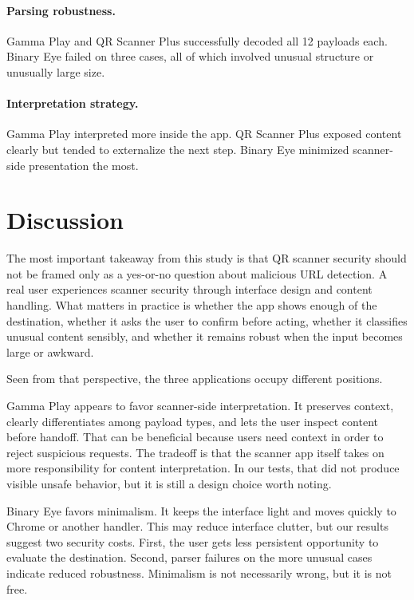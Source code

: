 \documentclass[11pt]{article}
\begin{document}
\paragraph{Parsing robustness.}
Gamma Play and QR Scanner Plus successfully decoded all 12 payloads each. Binary Eye failed on three cases, all of which involved unusual structure or unusually large size.

\paragraph{Interpretation strategy.}
Gamma Play interpreted more inside the app. QR Scanner Plus exposed content clearly but tended to externalize the next step. Binary Eye minimized scanner-side presentation the most.

\section{Discussion}

The most important takeaway from this study is that QR scanner security should not be framed only as a yes-or-no question about malicious URL detection. A real user experiences scanner security through interface design and content handling. What matters in practice is whether the app shows enough of the destination, whether it asks the user to confirm before acting, whether it classifies unusual content sensibly, and whether it remains robust when the input becomes large or awkward.

Seen from that perspective, the three applications occupy different positions.

Gamma Play appears to favor scanner-side interpretation. It preserves context, clearly differentiates among payload types, and lets the user inspect content before handoff. That can be beneficial because users need context in order to reject suspicious requests. The tradeoff is that the scanner app itself takes on more responsibility for content interpretation. In our tests, that did not produce visible unsafe behavior, but it is still a design choice worth noting.

Binary Eye favors minimalism. It keeps the interface light and moves quickly to Chrome or another handler. This may reduce interface clutter, but our results suggest two security costs. First, the user gets less persistent opportunity to evaluate the destination. Second, parser failures on the more unusual cases indicate reduced robustness. Minimalism is not necessarily wrong, but it is not free.
\end{document}

